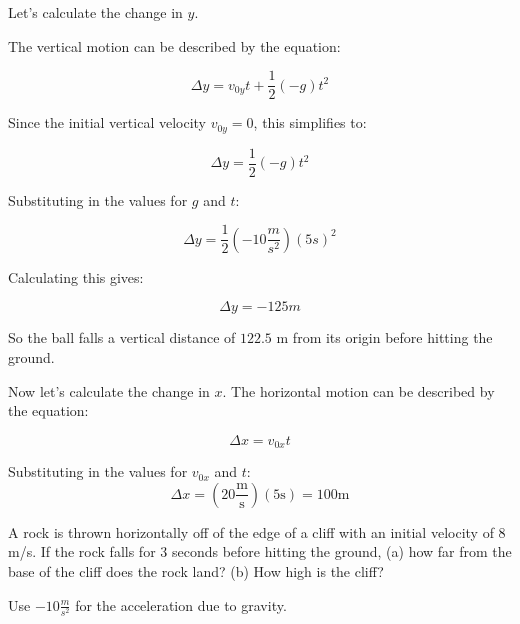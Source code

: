 \begin{tikzpicture}
\end{tikzpicture}

Let's calculate the change in $y$. 

The vertical motion can be described by the equation:

\[
\Delta y = v_{0y} t + \frac{1}{2} (-g) t^2
\]

Since the initial vertical velocity $v_{0y} = 0$, this simplifies to:

\[
\Delta y = \frac{1}{2} (-g) t^2
\]

Substituting in the values for $g$ and $t$:

\[
\Delta y = \frac{1}{2} (-10 \frac{m}{s^2}) (5 s)^2
\]

Calculating this gives:

\[
\Delta y = -125 m
\]

So the ball falls a vertical distance of $122.5$ m from its origin before hitting the ground.

Now let's calculate the change in $x$.
The horizontal motion can be described by the equation:

\[
\Delta x = v_{0x} t
\]

Substituting in the values for $v_{0x}$ and $t$:
\[
\Delta x = (20 \frac{\text{m}}{\text{s}}) (5 \text{s}) = 100 \text{m}
\]

\begin{Exercise}[title=Horizontally-launched Projectile, label=projectiles_horiz1]
A rock is thrown horizontally off of the edge of a cliff with an initial velocity of $8$ m/s. If the rock falls for $3$ seconds before hitting the ground, (a) how far from the base of the cliff does the rock land? (b) How high is the cliff? 

Use $-10 \frac{m}{s^2}$ for the acceleration due to gravity.
\end{Exercise}

